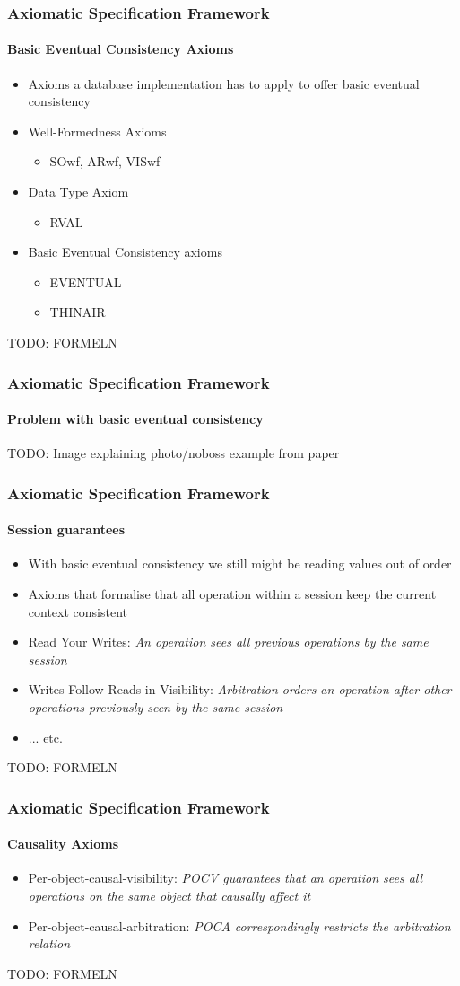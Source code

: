 \documentclass[11pt]{beamer}
\begin{document}
\begin{frame}
\frametitle{Axiomatic Specification Framework}
\framesubtitle{Basic Eventual Consistency Axioms}
\begin{itemize}
\item Axioms a database implementation has to apply to offer basic eventual consistency
\item Well-Formedness Axioms
\begin{itemize}
\item SOwf, ARwf, VISwf
\end{itemize}
\item Data Type Axiom
\begin{itemize}
\item RVAL
\end{itemize}
\item Basic Eventual Consistency axioms
\begin{itemize}
\item EVENTUAL
\item THINAIR
\end{itemize}
\end{itemize}
TODO: FORMELN
\end{frame}

\begin{frame}
\frametitle{Axiomatic Specification Framework}
\framesubtitle{Problem with basic eventual consistency}
TODO: Image explaining photo/noboss example from paper
\end{frame}

\begin{frame}
\frametitle{Axiomatic Specification Framework}
\framesubtitle{Session guarantees}
\begin{itemize}
\item With basic eventual consistency we still might be reading values out of order
\item Axioms that formalise that all operation within a session keep the current context consistent
\item Read Your Writes: \textit{An operation sees all previous operations
by the same session}
\item Writes Follow Reads in Visibility: \textit{Arbitration orders an
operation after other operations previously seen by the same session}
\item ... etc.
\end{itemize}
TODO: FORMELN
\end{frame}

\begin{frame}
\frametitle{Axiomatic Specification Framework}
\framesubtitle{Causality Axioms}
\begin{itemize}
\item Per-object-causal-visibility:
\textit{POCV guarantees that an operation sees all operations
on the same object that causally affect it}
\item Per-object-causal-arbitration:
\textit{POCA correspondingly
restricts the arbitration relation}
\end{itemize}
TODO: FORMELN
\end{frame}
\end{document}
